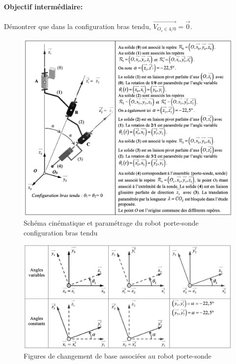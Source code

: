 \paragraph{Objectif intermédiaire:} Démontrer que dans la configuration bras tendu, $\overrightarrow{V_{O_s \in 4/0}}=\overrightarrow{0}$.



\begin{figure}[ht!]
\begin{center}
 \includegraphics[width=0.9\linewidth]{img/fig05}
\end{center}
\caption{Schéma cinématique et paramétrage du robot porte-sonde configuration bras tendu}
\label{fig05}
\end{figure}

\begin{figure}[ht!]
\begin{center}
 \includegraphics[width=0.9\linewidth]{img/fig06}
\end{center}
\caption{Figures de changement de base associées au robot porte-sonde}
\label{fig06}
\end{figure}


